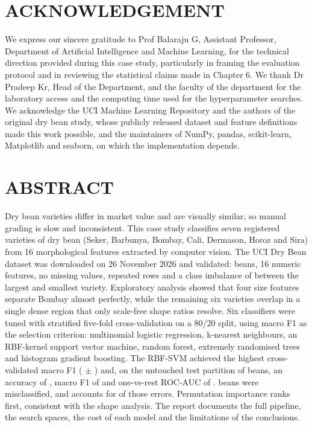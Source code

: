 \chapter*{ACKNOWLEDGEMENT}
\thispagestyle{frontmatter}

We express our sincere gratitude to Prof Balaraju G, Assistant Professor,
Department of Artificial Intelligence and Machine Learning, for the technical
direction provided during this case study, particularly in framing the evaluation
protocol and in reviewing the statistical claims made in Chapter 6. We thank
Dr Pradeep Kr, Head of the Department, and the faculty of the department for the
laboratory access and the computing time used for the hyperparameter searches. We acknowledge the UCI
Machine Learning Repository and the authors of the original dry bean study,
whose publicly released dataset and feature definitions made this work possible,
and the maintainers of NumPy, pandas, scikit-learn, Matplotlib and seaborn, on
which the implementation depends.

\chapter*{ABSTRACT}
\thispagestyle{frontmatter}

Dry bean varieties differ in market value and are visually similar, so manual
grading is slow and inconsistent. This case study classifies seven registered
varieties of dry bean (Seker, Barbunya, Bombay, Cali, Dermason, Horoz and Sira)
from 16 morphological features extracted by computer vision. The UCI Dry Bean
dataset was downloaded on 26 November 2026 and validated: \DatasetRows{} beans,
16 numeric features, no missing values, \DuplicateRows{} repeated rows and a
class imbalance of \ImbalanceRatio{} between the largest and smallest variety.
Exploratory analysis showed that four size features separate Bombay almost
perfectly, while the remaining six varieties overlap in a single dense region
that only scale-free shape ratios resolve. Six classifiers were tuned with
stratified five-fold cross-validation on a 80/20 split, using macro F1 as the
selection criterion: multinomial logistic regression, k-nearest neighbours, an
RBF-kernel support vector machine, random forest, extremely randomised trees and
histogram gradient boosting. The RBF-SVM achieved the highest cross-validated
macro F1 (\BestCV{} $\pm$ \BestCVStd{}) and, on the untouched test partition of
\TestRows{} beans, an accuracy of \BestAcc{}, macro F1 of \BestFOne{} and
one-vs-rest ROC-AUC of \BestAUC{}. \TestErrors{} beans were misclassified, and
\TopConfusion{} accounts for \TopConfusionN{} of those errors. Permutation
importance ranks \TopPermFeature{} first, consistent with the shape analysis.
The report documents the full pipeline, the search spaces, the cost of each
model and the limitations of the conclusions.

